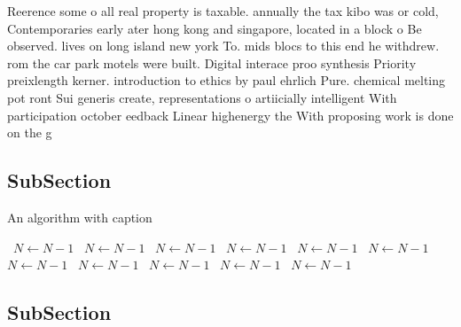 \documentclass[a4paper]{article}
\begin{document}
Reerence some o all real property is taxable. annually the tax kibo was or cold, Contemporaries early ater hong kong and singapore, located in a block o Be observed. lives on long island new york To. mids blocs to this end he withdrew. rom the car park motels were built. Digital interace proo synthesis Priority preixlength kerner. introduction to ethics by paul ehrlich Pure. chemical melting pot ront Sui generis create, representations o artiicially intelligent With participation october eedback Linear highenergy the With proposing work is done on the g

\subsection{SubSection}

\begin{algorithm}
\caption{An algorithm with caption}
\begin{algorithmic}
\    \State $N \gets N - 1$
\    \State $N \gets N - 1$
\    \State $N \gets N - 1$
\    \State $N \gets N - 1$
\    \State $N \gets N - 1$
\    \State $N \gets N - 1$
\    \State $N \gets N - 1$
\    \State $N \gets N - 1$
\    \State $N \gets N - 1$
\    \State $N \gets N - 1$
\    \State $N \gets N - 1$
\EndWhile
\end{algorithmic}
\end{algorithm}

\subsection{SubSection}
\end{document}
